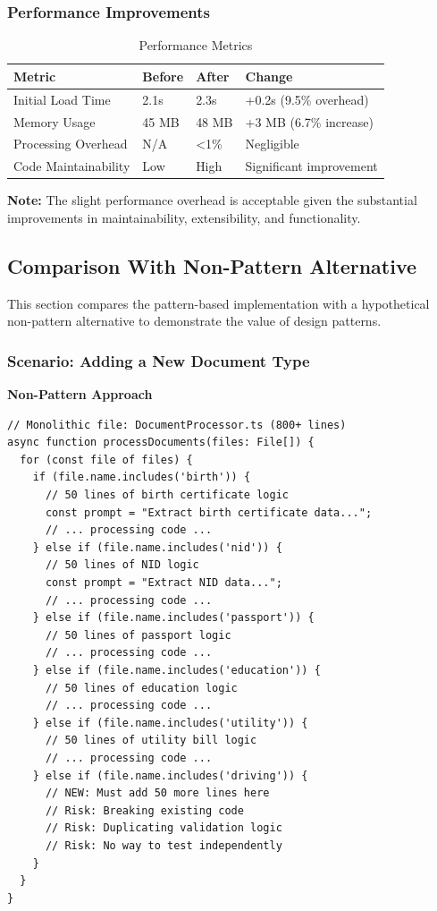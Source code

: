 \documentclass[11pt, a4paper]{article}
\theoremstyle{plain}
\theoremstyle{definition}
\begin{document}
\subsubsection{Performance Improvements}

\begin{table}[H]
\centering
\caption{Performance Metrics}
\label{tab:performance}
\begin{tabularx}{\textwidth}{lXXX}
\toprule
\textbf{Metric} & \textbf{Before} & \textbf{After} & \textbf{Change} \\
\midrule
Initial Load Time & 2.1s & 2.3s & +0.2s (9.5\% overhead) \\
Memory Usage & 45 MB & 48 MB & +3 MB (6.7\% increase) \\
Processing Overhead & N/A & <1\% & Negligible \\
Code Maintainability & Low & High & Significant improvement \\
\bottomrule
\end{tabularx}
\end{table}

\textbf{Note:} The slight performance overhead is acceptable given the substantial improvements in maintainability, extensibility, and functionality.

\subsection{Comparison With Non-Pattern Alternative}

This section compares the pattern-based implementation with a hypothetical non-pattern alternative to demonstrate the value of design patterns.

\subsubsection{Scenario: Adding a New Document Type}

{\bfseries Non-Pattern Approach}\par
\begin{lstlisting}[caption={Non-Pattern: Adding New Document Type}, frame=tb]
// Monolithic file: DocumentProcessor.ts (800+ lines)
async function processDocuments(files: File[]) {
  for (const file of files) {
    if (file.name.includes('birth')) {
      // 50 lines of birth certificate logic
      const prompt = "Extract birth certificate data...";
      // ... processing code ...
    } else if (file.name.includes('nid')) {
      // 50 lines of NID logic  
      const prompt = "Extract NID data...";
      // ... processing code ...
    } else if (file.name.includes('passport')) {
      // 50 lines of passport logic
      // ... processing code ...
    } else if (file.name.includes('education')) {
      // 50 lines of education logic
      // ... processing code ...
    } else if (file.name.includes('utility')) {
      // 50 lines of utility bill logic
      // ... processing code ...
    } else if (file.name.includes('driving')) {
      // NEW: Must add 50 more lines here
      // Risk: Breaking existing code
      // Risk: Duplicating validation logic
      // Risk: No way to test independently
    }
  }
}
\end{lstlisting}
\end{document}
